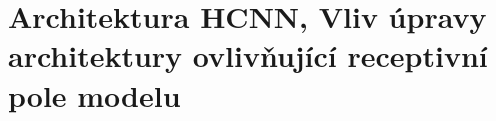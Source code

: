 \documentclass[12pt,a4paper]{report}
\begin{document}



\tableofcontents











\listoffigures

\listoftables




\section{Architektura HCNN, Vliv úpravy architektury ovlivňující receptivní pole modelu}\label{appendix:hcnn_ctx}
\end{document}
